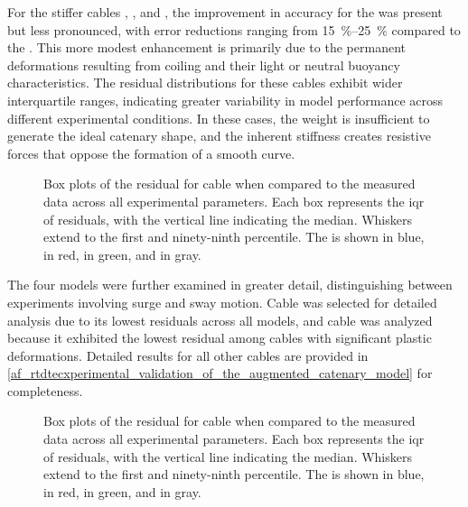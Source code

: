 For the stiffer cables , , and
, the improvement in accuracy for the \thetagammamodel{} was present
but less pronounced, with error reductions ranging from \qtyrange{15}{25}{\percent} compared to the
\verticalmodel{}. This more modest enhancement is primarily due to the permanent deformations
resulting from coiling and their light or neutral buoyancy characteristics. The residual
distributions for these cables exhibit wider interquartile ranges, indicating greater variability
in model performance across different experimental conditions. In these cases, the weight is
insufficient to generate the ideal catenary shape, and the inherent stiffness creates resistive
forces that oppose the formation of a smooth curve.

\begin{figure}
	\centering
	\caption{
		Box plots of the residual for cable  when compared to the measured
		data across all experimental parameters. Each box represents the \ac{iqr} of residuals, with the
		vertical line indicating the median. Whiskers extend to the first and ninety-ninth percentile. The
		\verticalmodel{} is shown in blue, \gammamodel{} in red, \thetamodel{} in green, and
		\thetagammamodel{} in gray.
	}
	\label{cm_acm_ev_sr_cable_3_boxplot}
\end{figure}

The four models were further examined in greater detail, distinguishing between experiments
involving surge and sway motion. Cable  was selected for detailed
analysis due to its lowest residuals across all models, and cable  was
analyzed because it exhibited the lowest residual among cables with significant plastic
deformations. Detailed results for all other cables are provided in
\cref{af_rtdtecxperimental_validation_of_the_augmented_catenary_model} for completeness.

\begin{figure}
	\centering
	\caption{
		Box plots of the residual for cable  when compared to the measured
		data across all experimental parameters. Each box represents the \ac{iqr} of residuals, with the
		vertical line indicating the median. Whiskers extend to the first and ninety-ninth percentile. The
		\verticalmodel{} is shown in blue, \gammamodel{} in red, \thetamodel{} in green, and
		\thetagammamodel{} in gray.
	}
	\label{cm_acm_ev_sr_cable_6_boxplot}
\end{figure}

